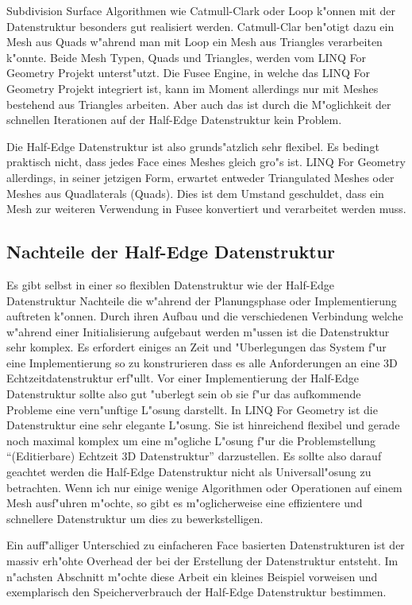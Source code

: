 \documentclass[pagesize, paper=a4, fontsize=12pt,titlepage=true, headings=small, headnosepline, abstractoff, liststotoc, nochapterprefix, plainheadsepline]{scrreprt}
\newcommand{\LFGS}{LINQ For Geometry }
\newcommand{\HES}{Half-Edge Datenstruktur }
\begin{document}
Subdivision Surface Algorithmen wie Catmull-Clark oder Loop k"onnen mit der Datenstruktur besonders gut realisiert werden. Catmull-Clar ben"otigt dazu ein Mesh aus Quads w"ahrend man mit Loop ein Mesh aus Triangles verarbeiten k"onnte. Beide Mesh Typen, Quads und Triangles, werden vom \LFGS Projekt unterst"utzt. Die Fusee Engine, in welche das \LFGS Projekt integriert ist, kann im Moment allerdings nur mit Meshes bestehend aus Triangles arbeiten. Aber auch das ist durch die M"oglichkeit der schnellen Iterationen auf der \HES kein Problem.

Die \HES ist also grunds"atzlich sehr flexibel. Es bedingt praktisch nicht, dass jedes Face eines Meshes gleich gro"s ist. \LFGS allerdings, in seiner jetzigen Form, erwartet entweder Triangulated Meshes oder Meshes aus Quadlaterals (Quads). Dies ist dem Umstand geschuldet, dass ein Mesh zur weiteren Verwendung in Fusee konvertiert und verarbeitet werden muss.
		\subsection {Nachteile der \HES}
Es gibt selbst in einer so flexiblen Datenstruktur wie der \HES Nachteile die w"ahrend der Planungsphase oder Implementierung auftreten k"onnen.
			Durch ihren Aufbau und die verschiedenen Verbindung welche w"ahrend einer Initialisierung aufgebaut werden m"ussen ist die Datenstruktur sehr komplex. Es erfordert einiges an Zeit und "Uberlegungen das System f"ur eine Implementierung so zu konstrurieren dass es alle Anforderungen an eine 3D Echtzeitdatenstruktur erf"ullt. Vor einer Implementierung der \HES sollte also gut "uberlegt sein ob sie f"ur das aufkommende Probleme eine vern"unftige L"osung darstellt. In \LFGS ist die Datenstruktur eine sehr elegante L"osung. Sie ist hinreichend flexibel und gerade noch maximal komplex um eine m"ogliche L"osung f"ur die Problemstellung "`(Editierbare) Echtzeit 3D Datenstruktur"' darzustellen. Es sollte also darauf geachtet werden die \HES nicht als Universall"osung zu betrachten. Wenn ich nur einige wenige Algorithmen oder Operationen auf einem Mesh ausf"uhren m"ochte, so gibt es m"oglicherweise eine effizientere und schnellere Datenstruktur um dies zu bewerkstelligen.

Ein auff"alliger Unterschied zu einfacheren Face basierten Datenstrukturen ist der massiv erh"ohte Overhead der bei der Erstellung der Datenstruktur entsteht. Im n"achsten Abschnitt m"ochte diese Arbeit ein kleines Beispiel vorweisen und exemplarisch den Speicherverbrauch der \HES bestimmen.
\end{document}
